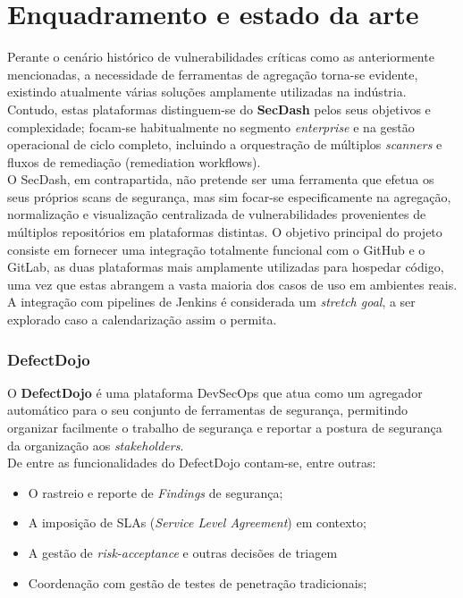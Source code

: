 \chapter{Enquadramento e estado da arte} \label{capenquadramento}

Perante o cenário histórico de vulnerabilidades críticas como as anteriormente mencionadas, a necessidade de ferramentas de agregação torna-se evidente, existindo atualmente várias soluções amplamente utilizadas na indústria. Contudo, estas plataformas distinguem-se do \textbf{SecDash} pelos seus objetivos e complexidade; focam-se habitualmente no segmento \textit{enterprise} e na gestão operacional de ciclo completo, incluindo a orquestração de múltiplos \textit{scanners} e fluxos de remediação (remediation workflows). \\

O SecDash, em contrapartida, não pretende ser uma ferramenta que efetua os seus próprios scans de segurança, mas sim focar-se especificamente na agregação, normalização e visualização centralizada de vulnerabilidades provenientes de múltiplos repositórios em plataformas distintas. O objetivo principal do projeto consiste em fornecer uma integração totalmente funcional com o GitHub e o GitLab, as duas plataformas mais amplamente utilizadas para hospedar código, uma vez que estas abrangem a vasta maioria dos casos de uso em ambientes reais. A integração com pipelines de Jenkins é considerada um \textit{stretch goal}, a ser explorado caso a calendarização assim o permita. \\

\subsection{DefectDojo}
O \textbf{DefectDojo} é uma plataforma DevSecOps que atua como um agregador automático para o seu conjunto de ferramentas de segurança, permitindo organizar facilmente o trabalho de segurança e reportar a postura de segurança da organização aos \textit{stakeholders}. \cite{aboutdefectdojo}\\

De entre as funcionalidades do DefectDojo contam-se, entre outras:
\begin{itemize}
	\item O rastreio e reporte de \textit{Findings} de segurança;
	\item A imposição de SLAs (\textit{Service Level Agreement}) em contexto;
	\item A gestão de \textit{risk-acceptance} e outras decisões de triagem
	\item Coordenação com gestão de testes de penetração tradicionais;
\end{itemize}

